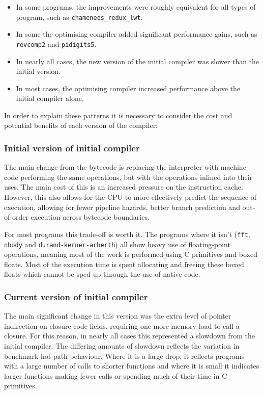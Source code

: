 \begin{itemize}
      \item In some programs, the improvements were roughly equivalent for all types of
            program, such as \texttt{chameneos\_redux\_lwt}.
      \item In some the optimising compiler added significant performance gains, such as
            \texttt{revcomp2} and \texttt{pidigits5}.
      \item In nearly all cases, the new version of the initial compiler was slower than the
            initial
            version.
      \item In most cases, the optimising compiler increased performance above the initial compiler
            alone.
\end{itemize}

In order to explain these patterns it is necessary to consider the cost and potential benefits of
each version of the compiler:

\subsubsection{Initial version of initial compiler}

The main change from the bytecode is replacing the interpreter with machine code performing the
same operations, but with the operations inlined into their uses. The main cost of this is an
increased pressure on the instruction cache. However, this also allows for the CPU to more
effectively predict the sequence of execution, allowing for fewer pipeline hazards, better branch
prediction and out-of-order execution across bytecode boundaries.

For most programs this trade-off is worth it.  The programs where it isn't (\texttt{fft},
\texttt{nbody} and \texttt{durand-kerner-arberth}) all show heavy use of floating-point operations,
meaning most of the work is performed using C primitives and boxed floats. Most of the execution
time is spent allocating and freeing these boxed floats which cannot be sped up through the use of
native code.

\subsubsection{Current version of initial compiler}

The main significant change in this version was the extra level of pointer indirection on closure
code fields, requiring one more memory load to call a closure. For this reason, in nearly all cases
this represented a slowdown from the initial compiler. The differing amounts of slowdown reflects
the variation in benchmark hot-path behaviour. Where it is a large drop, it reflects programs with
a large number of calls to shorter functions and where it is small it indicates larger functions
making fewer calls or spending much of their time in C primitives.

